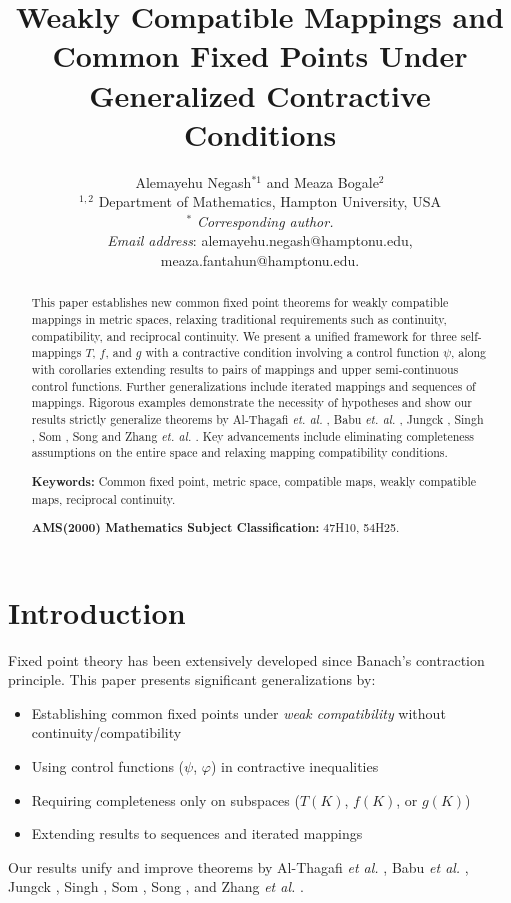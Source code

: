 \documentclass[a4paper,12pt,oneside]{article}
\title{Weakly Compatible Mappings and Common Fixed Points Under Generalized Contractive Conditions}
\author{Alemayehu Negash$^{*1}$ and Meaza Bogale$^2$\\
$^{1,2}$ Department of Mathematics, Hampton University,  USA  \\
$^*$ \textit{Corresponding author.} \\
\textit{Email address}: alemayehu.negash@hamptonu.edu,\\  meaza.fantahun@hamptonu.edu.}
\date{}
\numberwithin{equation}{section}
\begin{document}
\maketitle

\begin{abstract}
  This paper establishes new common fixed point theorems for weakly compatible mappings in metric spaces, relaxing traditional requirements such as continuity, compatibility, and reciprocal continuity. We present a unified framework for three self-mappings \(T\), \(f\), and \(g\) with a contractive condition involving a control function \(\psi\), along with corollaries extending results to pairs of mappings and upper semi-continuous control functions. Further generalizations include iterated mappings and sequences of mappings. Rigorous examples demonstrate the necessity of hypotheses and show our results strictly generalize theorems by Al-Thagafi \emph{et. al.} \cite{Al-Thagafi2006}, Babu \emph{et. al.} \cite{Babu2007}, Jungck \cite{Jungck1976,Jungck1986}, Singh \cite{Singh1986,Singh1997a}, Som \cite{Som2003}, Song \cite{Song2007} and Zhang \emph{et. al.} \cite{Zhang2008}. Key advancements include eliminating completeness assumptions on the entire space and relaxing mapping compatibility conditions. 

\textbf{Keywords:} Common fixed point, metric space, compatible maps, weakly compatible maps, reciprocal continuity.


\textbf{AMS(2000) Mathematics Subject Classification:} 47H10, 54H25.
\end{abstract}

\section{Introduction}
Fixed point theory has been extensively developed since Banach's contraction principle. This paper presents significant generalizations by:
\begin{itemize}
    \item Establishing common fixed points under \textit{weak compatibility} without continuity/compatibility
    \item Using control functions (\(\psi\), \(\varphi\)) in contractive inequalities
    \item Requiring completeness only on subspaces (\(T(K)\), \(f(K)\), or \(g(K)\))
    \item Extending results to sequences and iterated mappings
\end{itemize}
Our results unify and improve theorems by Al-Thagafi \textit{et al.} \cite{Al-Thagafi2006}, Babu \textit{et al.} \cite{Babu2007}, Jungck \cite{Jungck1976}, Singh \cite{Singh1986,Singh1997a}, Som \cite{Som2003}, Song \cite{Song2007}, and Zhang \textit{et al.} \cite{Zhang2008}.
\end{document}
